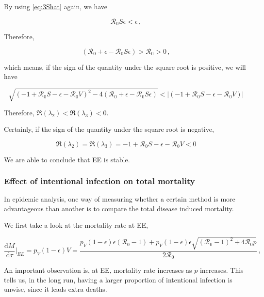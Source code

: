 \documentclass[12pt]{article}
\newcommand\dbyd[2]{\frac{\mathrm d{#1}}{\mathrm d{#2}}}
\newcommand{\R}{\mathcal{R}}
\newcommand{\pmV}{p_{V}}
\begin{document}
By using \autoref{eq:3Shat} again, we have
\begin{linenomath*}
\begin{equation}
\R_0 S\epsilon<\epsilon\,,
\end{equation}
\end{linenomath*}

Therefore,
\begin{linenomath*}
\begin{equation}
(\R_0+\epsilon-\R_0 S\epsilon)>\R_0 >0\,,
\end{equation}
\end{linenomath*}
which means, if the sign of the quantity under the square root is positive, we will have
\begin{linenomath*}
\begin{equation}
\sqrt{(-1+\R_0 S-\epsilon-\R_0 V)^2-4(\R_0+\epsilon-\R_0 S\epsilon)}<|(-1+\R_0 S-\epsilon-\R_0 V)|
\end{equation}
\end{linenomath*}
Therefore, $\Re(\lambda_2)<\Re(\lambda_3)<0$.

Certainly, if the sign of the quantity under the square root is negative,
\begin{linenomath*}
\begin{equation}
\Re(\lambda_2)=\Re(\lambda_3)=-1+\R_0 S-\epsilon-\R_0 V<0
\end{equation}
\end{linenomath*}

We are able to conclude that EE is stable.

\subsubsection{Effect of intentional infection on total mortality}

In epidemic analysis, one way of measuring whether a certain method is more advantageous than another is to compare the total disease induced mortality. 

We first take a look at the mortality rate at EE,
\begin{linenomath*}
\begin{equation}
\dbyd{M}{\tau}|_{EE}=\pmV(1-\epsilon)V=\frac{\pmV(1-\epsilon)\epsilon(\R_0 -1)+ \pmV(1-\epsilon)\epsilon \sqrt{(\R_0-1)^2+4\R_0 p}}{2\R_0}\,, \label{eq:dMdt}
\end{equation}
\end{linenomath*}

An important observation is, at EE, mortality rate increases as $p$ increases. This tells us, in the long run, having a larger proportion of intentional infection is unwise, since it leads extra deaths.
\end{document}
